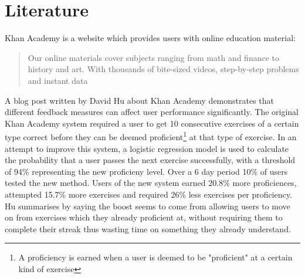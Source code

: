 \section{Literature}
Khan Academy\cite{khan_site} is a website which provides users with online education material:
\begin{quote}
Our online materials cover subjects ranging from math and finance to history and art.  With thousands of bite-sized videos, step-by-step problems and instant data
\end{quote}
A blog post\cite{khan_blog} written by David Hu about Khan Academy demonstrates that different feedback measures can affect user performance significantly. The original Khan Academy system required a user to get 10 consecutive exercises of a certain type correct before they can be deemed proficient\footnote{A proficiency is earned when a user is deemed to be "proficient" at a certain kind of exercise} at that type of exercise. In an attempt to improve this system, a logistic regression model is used to calculate the probability that a user passes the next exercise successfully, with a threshold of 94\% representing the new proficieny level. Over a 6 day period 10\% of users tested the new method. Users of the new system earned 20.8\% more proficiences, attempted 15.7\% more exercises and required 26\% less exercises per proficiency. Hu summarises by saying the boost seems to come from allowing users to move on from exercises which they already proficient at, without requiring them to complete their streak thus wasting time on something they already understand.
